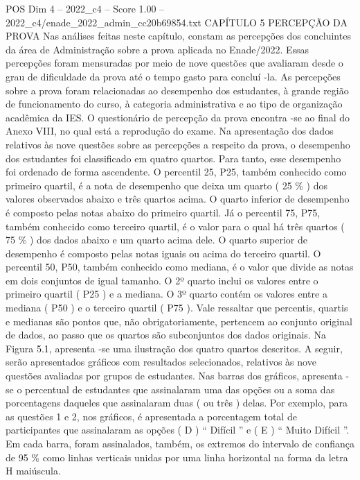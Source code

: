 \begin{textsample}{POS Dim 4 – 2022\_c4 – Score 1.00 – 2022\_c4/enade\_2022\_admin\_cc20b69854.txt}  \label{ex:f4_pos_143}
CAPÍTULO 5 PERCEPÇÃO DA PROVA Nas análises feitas neste capítulo, constam as percepções dos concluintes da área de Administração sobre a prova aplicada no Enade/2022.
Essas percepções foram mensuradas por meio de nove questões que avaliaram desde o grau de dificuldade da prova até o tempo gasto para concluí -la.
As percepções sobre a prova foram relacionadas ao desempenho dos estudantes, à grande região de funcionamento do curso, à categoria administrativa e ao tipo de organização acadêmica da IES.
O questionário de percepção da prova encontra -se ao final do Anexo VIII, no qual está a reprodução do exame.
Na apresentação dos dados relativos às nove questões sobre as percepções a respeito da prova, o desempenho dos estudantes foi classificado em quatro quartos.
Para tanto, esse desempenho foi ordenado de forma ascendente.
O percentil 25, P25, também conhecido como primeiro quartil, é a nota de desempenho que deixa um quarto ( 25 \% ) dos valores observados abaixo e três quartos acima.
O quarto inferior de desempenho é composto pelas notas abaixo do primeiro quartil.
Já o percentil 75, P75, também conhecido como terceiro quartil, é o valor para o qual há três quartos ( 75 \% ) dos dados abaixo e um quarto acima dele.
O quarto superior de desempenho é composto pelas notas iguais ou acima do terceiro quartil.
O percentil 50, P50, também conhecido como mediana, é o valor que divide as notas em dois conjuntos de igual tamanho.
O 2º quarto inclui os valores entre o primeiro quartil ( P25 ) e a mediana.
O 3º quarto contém os valores entre a mediana ( P50 ) e o terceiro quartil ( P75 ).
Vale ressaltar que percentis, quartis e medianas são pontos que, não obrigatoriamente, pertencem ao conjunto original de dados, ao passo que os quartos são subconjuntos dos dados originais.
Na Figura 5.1, apresenta -se uma ilustração dos quatro quartos descritos.
A seguir, serão apresentados gráficos com resultados selecionados, relativos às nove questões avaliadas por grupos de estudantes.
Nas barras dos gráficos, apresenta -se o percentual de estudantes que assinalaram uma das opções ou a soma das porcentagens daqueles que assinalaram duas ( ou três ) delas.
Por exemplo, para as questões 1 e 2, nos gráficos, é apresentada a porcentagem total de participantes que assinalaram as opções ( D ) “ Difícil ” e ( E ) “ Muito Difícil ”.
Em cada barra, foram assinalados, também, os extremos do intervalo de confiança de 95 \% como linhas verticais unidas por uma linha horizontal na forma da letra H maiúscula.

\end{textsample}
